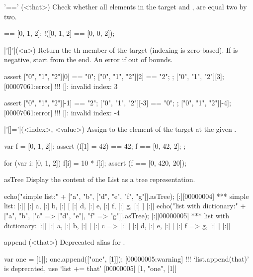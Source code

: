 \begin{urbiscriptapi}
\item['=='](<that>)%
Check whether all elements in the target and , are
equal two by two.

\begin{urbiassert}
[0, 1, 2] == [0, 1, 2];
!([0, 1, 2] == [0, 0, 2]);
\end{urbiassert}


\item|'[]'|(<n>)%
  Return the th member of the target (indexing is
  zero-based). If  is negative, start from the end.  An error
  if out of bounds.

\begin{urbiscript}
assert
{
  ["0", "1", "2"][0] == "0";
  ["0", "1", "2"][2] == "2";
};
["0", "1", "2"][3];
[00007061:error] !!! []: invalid index: 3

assert
{
  ["0", "1", "2"][-1] == "2";
  ["0", "1", "2"][-3] == "0";
};
["0", "1", "2"][-4];
[00007061:error] !!! []: invalid index: -4
\end{urbiscript}


\item|'[]='|(<index>, <value>)%
  Assign  to the element of the target at the given
  .

\begin{urbiscript}
var f = [0, 1, 2]|;
assert
{
  (f[1] = 42) == 42;
  f == [0, 42, 2];
};

for (var i: [0, 1, 2])
  f[i] = 10 * f[i];
assert (f == [0, 420, 20]);
\end{urbiscript}

\item[asTree]%
Display the content of the List as a tree representation.
\begin{urbiscript}
echo("simple list:" + ["a", "b", ["d", "e", "f", "g"]].asTree);
[:][00000004] *** simple list:
[:][
[:]  a,
[:]  b,
[:]  [
[:]    d,
[:]    e,
[:]    f,
[:]    g,
[:]  ]
[:]]
echo("list with dictionary:" +
  ["a", "b", ["c" => ["d", "e"], "f" => "g"]].asTree);
[:][00000005] *** list with dictionary:
[:][
[:]  a,
[:]  b,
[:]  [
[:]    c =>
[:]    [
[:]      d,
[:]      e,
[:]    ]
[:]    f => g,
[:]  ]
[:]]
\end{urbiscript}

\item[append](<that>)%
  Deprecated alias for .

\begin{urbiscript}
var one = [1]|;
one.append(["one", [1]]);
[00000005:warning] !!! `list.append(that)' is deprecated, use `list += that'
[00000005] [1, "one", [1]]
\end{urbiscript}



\end{urbiscriptapi}
